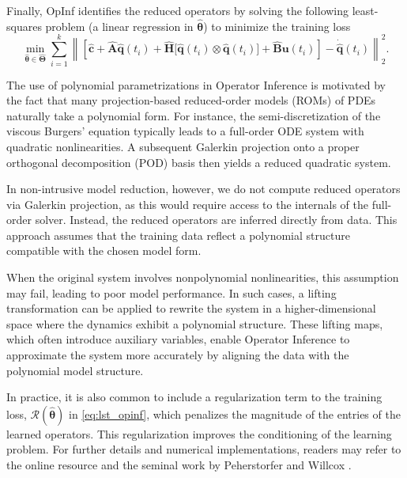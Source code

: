 \begin{enumerate}[label=\arabic*)]
Finally, OpInf identifies the reduced operators by solving the following least-squares problem (a linear regression in \(\hat{\bm{\theta}}\)) to minimize the training loss\\
\begin{equation}
    \min_{\hat{\bm{\theta}} \in \hat{\bm{\Theta}}} \sum_{i=1}^{k} \left\| \left[ \hat{\mathbf{c}} + \hat{\mathbf{A}}\hat{\mathbf{q}}(t_i) + \hat{\mathbf{H}}\bigl[ \hat{\mathbf{q}}(t_i) \otimes \hat{\mathbf{q}}(t_i) \bigr] + \hat{\mathbf{B}}\mathbf{u}(t_i) \right] - \dot{\hat{\mathbf{q}}}(t_i) \right\|_2^2.
    \label{eq:lst_opinf}
\end{equation}

The use of polynomial parametrizations in Operator Inference is motivated by the fact that many projection-based reduced-order models (ROMs) of PDEs naturally take a polynomial form. For instance, the semi-discretization of the viscous Burgers' equation typically leads to a full-order ODE system with quadratic nonlinearities. A subsequent Galerkin projection onto a proper orthogonal decomposition (POD) basis then yields a reduced quadratic system.

In non-intrusive model reduction, however, we do not compute reduced operators via Galerkin projection, as this would require access to the internals of the full-order solver. Instead, the reduced operators are inferred directly from data. This approach assumes that the training data reflect a polynomial structure compatible with the chosen model form.

When the original system involves nonpolynomial nonlinearities, this assumption may fail, leading to poor model performance. In such cases, a lifting transformation can be applied to rewrite the system in a higher-dimensional space where the dynamics exhibit a polynomial structure. These lifting maps, which often introduce auxiliary variables, enable Operator Inference to approximate the system more accurately by aligning the data with the polynomial model structure.

In practice, it is also common to include a regularization term to the training loss, $\mathcal{R}(\hat{\bm{\theta}})$ in \eqref{eq:lst_opinf}, which penalizes the magnitude of the entries of the learned operators. This regularization improves the conditioning of the learning problem. For further details and numerical implementations, readers may refer to the online resource \cite{opinf2025} and the seminal work by Peherstorfer and Willcox \cite{peherstorfer2016data}.
\end{enumerate}

